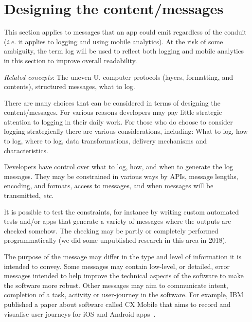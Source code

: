 \section{Designing the content/messages} 
This section applies to messages that an app could emit regardless of the conduit (\emph{i.e.} it applies to logging and using mobile analytics). At the risk of some ambiguity, the term log will be used to reflect both logging and mobile analytics in this section to improve overall readability.

\emph{Related concepts}: The uneven U, computer protocols (layers, formatting, and contents), structured messages, what to log. %

There are many choices that can be considered in terms of designing the content/messages. For various reasons developers may pay little strategic attention to logging in their daily work. For those who do choose to consider logging strategically there are various considerations, including:
What to log, how to log, where to log, data transformations, delivery mechanisms and characteristics.

Developers have control over what to log, how, and when to generate the log messages. They may be constrained in various ways by APIs, message lengths, encoding, and formats, access to messages, and when messages will be transmitted, \emph{etc.} 

It is possible to test the constraints, for instance by writing custom automated tests and/or apps that generate a variety of messages where the outputs are checked somehow. The checking may be partly or completely performed programmatically (we did some unpublished research in this area in 2018).

The purpose of the message may differ in the type and level of information it is intended to convey. Some messages may contain low-level, or detailed, error messages intended to help improve the technical aspects of the software to make the software more robust. Other messages may aim to communicate intent, completion of a task, activity or user-journey in the software. For example, IBM published a paper about software called CX Mobile that aims to record and visualise user journeys for iOS and Android apps~\cite{hu_tealeaf_cxmobile}.

